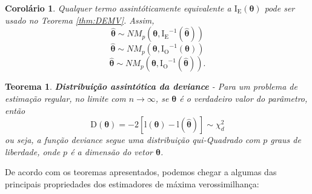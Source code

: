 \documentclass[
  9pt,
  a5paper,
]{book}
\newtheorem{theorem}{Teorema}[chapter]
\newtheorem{corollary}{Corolário}[chapter]
\theoremstyle{definition}
\theoremstyle{definition}
\theoremstyle{definition}
\theoremstyle{definition}
\theoremstyle{remark}
\begin{document}
\begin{corollary}
\protect\hypertarget{cor:RESEMV}{}\label{cor:RESEMV}Qualquer termo assintóticamente equivalente a \(\mathrm{I_E}(\boldsymbol{\theta})\) pode ser usado no Teorema \ref{thm:DEMV}. Assim,
\[ \hat{\boldsymbol{\theta}} \sim NM_p(\boldsymbol{\theta}, \mathrm{I_E}^{-1}(\boldsymbol{\hat{\theta}}))\]
\[ \hat{\boldsymbol{\theta}} \sim NM_p(\boldsymbol{\theta}, \mathrm{I_O}^{-1}(\boldsymbol{\theta}))\]
\[ \hat{\boldsymbol{\theta}} \sim NM_p(\boldsymbol{\theta}, \mathrm{I_O}^{-1}(\boldsymbol{\hat{\theta}})).\]
\end{corollary}

\begin{theorem}
\protect\hypertarget{thm:ASS}{}\label{thm:ASS}\textbf{Distribuição assintótica da deviance} - Para um problema de estimação regular, no limite com \(n \to \infty\), se \(\boldsymbol{\theta}\) é o verdadeiro valor do parâmetro, então
\[ \mathrm{D}(\boldsymbol{\theta}) = -2[\mathrm{l}(\boldsymbol{\theta})-\mathrm{l}(\hat{\boldsymbol{\theta}})] \sim \chi^2_d \]
ou seja, a função deviance segue uma distribuição qui-Quadrado com \(p\) graus de liberdade, onde \(p\) é a dimensão do vetor \(\boldsymbol{\theta}\).
\end{theorem}

De acordo com os teoremas apresentados, podemos chegar a algumas das principais propriedades dos estimadores de máxima verossimilhança:
\end{document}
